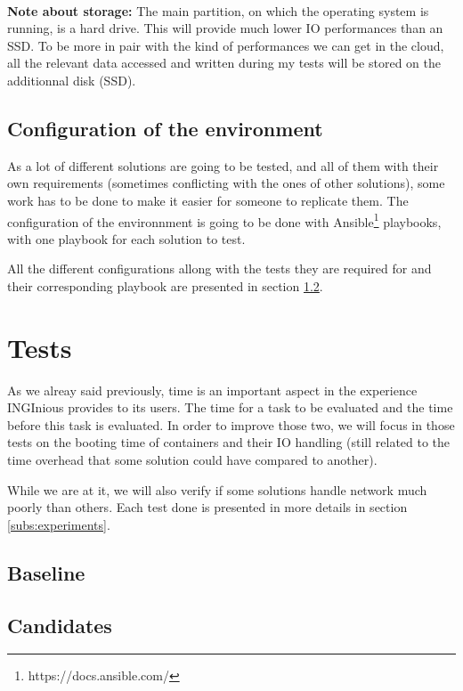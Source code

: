 \paragraph{}\textbf{Note about storage:} The main partition, on which the operating system is running, is a hard drive.  This will provide much lower IO performances than an SSD.  To be more in pair with the kind of performances we can get in the cloud, all the relevant data accessed and written during my tests will be stored on the additionnal disk (SSD).

\subsection{Configuration of the environment}
As a lot of different solutions are going to be tested, and all of them with their own requirements (sometimes conflicting with the ones of other solutions), some work has to be done to make it easier for someone to replicate them.  The configuration of the environnment is going to be done with Ansible\footnote{https://docs.ansible.com/} playbooks, with one playbook for each solution to test.

All the different configurations allong with the tests they are required for and their corresponding playbook are presented in section \ref{subs:candidates}.

\section{Tests}
As we alreay said previously, time is an important aspect in the experience INGInious provides to its users.  The time for a task to be evaluated and the time before this task is evaluated.  In order to improve those two, we will focus in those tests on the booting time of containers and their IO handling (still related to the time overhead that some solution could have compared to another).  %

While we are at it, we will also verify if some solutions handle network much poorly than others.  Each test done is presented in more details in section \ref{subs:experiments}.

\subsection{Baseline}

\subsection{Candidates}\label{subs:candidates}

